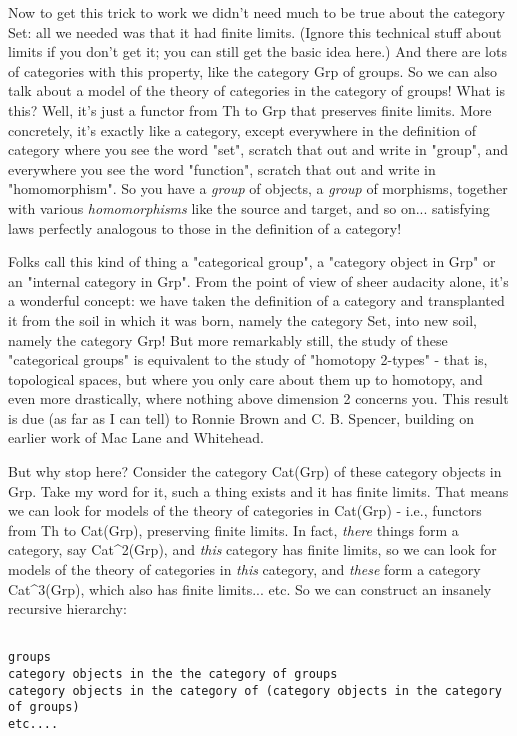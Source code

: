 Now to get this trick to work we didn't need much to be true about the
category Set: all we needed was that it had finite limits.  (Ignore this
technical stuff about limits if you don't get it; you can still get the
basic idea here.)  And there are lots of categories with this property,
like the category Grp of groups.  So we can also talk about a model of
the theory of categories in the category of groups!  What is this?
Well, it's just a functor from Th to Grp that preserves finite limits.
More concretely, it's exactly like a category, except everywhere in the
definition of category where you see the word "set", scratch that out
and write in "group", and everywhere you see the word "function",
scratch that out and write in "homomorphism".  So you have a
\emph{group} of objects, a \emph{group} of morphisms, together with
various \emph{homomorphisms} like the source and target, and so
on... satisfying laws perfectly analogous to those in the definition of
a category!

Folks call this kind of thing a "categorical group", a "category
object in Grp" or an "internal category in Grp".  From the point of
view of sheer audacity alone, it's a wonderful concept: we have taken
the definition of a category and transplanted it from the soil in
which it was born, namely the category Set, into new soil, namely the
category Grp!  But more remarkably still, the study of these
"categorical groups" is equivalent to the study of "homotopy 2-types"
- that is, topological spaces, but where you only care about them up
to homotopy, and even more drastically, where nothing above dimension
2 concerns you.  This result is due (as far as I can tell) to Ronnie
Brown and C. B. Spencer, building on earlier work of Mac Lane and
Whitehead.

But why stop here?  Consider the category Cat(Grp) of these
category objects in Grp.  Take my word for it, such a thing exists and
it has finite limits.  That means we can look for models of the theory
of categories in Cat(Grp) - i.e., functors from Th to Cat(Grp),
preserving finite limits.  In fact, \emph{there} things form a
category, say Cat^{2}(Grp), and \emph{this} category has
finite limits, so we can look for models of the theory of categories
in \emph{this} category, and \emph{these} form a category
Cat^{3}(Grp), which also has finite limits... etc.  So we can
construct an insanely recursive hierarchy:


\begin{verbatim}

groups
category objects in the the category of groups
category objects in the category of (category objects in the category of groups)
etc....

\end{verbatim}
    
